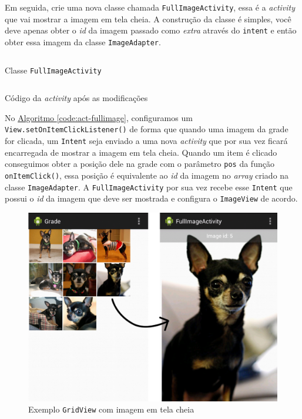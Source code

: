 \documentclass[a4paper,12pt,brazil,oneside]{book}
\begin{document}
\begin{singlespace}
Em seguida, crie uma nova classe chamada \texttt{FullImageActivity}, essa é a \emph{activity} que vai mostrar a imagem em tela cheia. A construção da classe é simples, você deve apenas obter o \emph{id} da imagem passado como \emph{extra} através do \texttt{intent} e então obter essa imagem da classe \texttt{ImageAdapter}.

\begin{listing}[H]
\inputminted[linenos=true,fontsize=\small,frame=lines, framesep=2mm, tabsize=2,numbersep=5pt]{java}{src/design/FullImageActivity.java}
\caption{Classe \texttt{FullImageActivity}}
\end{listing}	 	 	

\begin{listing}[H]
\inputminted[linenos=true,fontsize=\small,frame=lines, framesep=2mm, tabsize=2,numbersep=5pt]{java}{src/design/grid-activity-p2.java}
\caption{Código da \emph{activity} após as modificações}
\label{code:act-fullimage}
\end{listing}	 

No \hyperref[code:act-fullimage]{Algoritmo \ref*{code:act-fullimage}}, configuramos um \texttt{View.setOnItemClickListener()} de forma que quando uma imagem da grade for clicada, um \texttt{Intent} seja enviado a uma nova \emph{activity} que por sua vez ficará encarregada de mostrar a imagem em tela cheia.  Quando um item é clicado conseguimos obter a posição dele na grade com o parâmetro \texttt{pos} da função \texttt{onItemClick()}, essa posição é equivalente ao \emph{id} da imagem no \emph{array} criado na classe \texttt{ImageAdapter}.  A \texttt{FullImageActivity} por sua vez recebe esse \texttt{Intent} que possui o \emph{id} da imagem que deve ser mostrada e configura o \texttt{ImageView} de acordo. 

\begin{figure}[H]
  \centering
  \includegraphics[width=.80\textwidth]{figuras/design/grid-fullimage.jpg}
  \caption{Exemplo \texttt{GridView} com imagem em tela cheia}
  \label{fig:e16}
\end{figure}


\end{singlespace}
\end{document}
